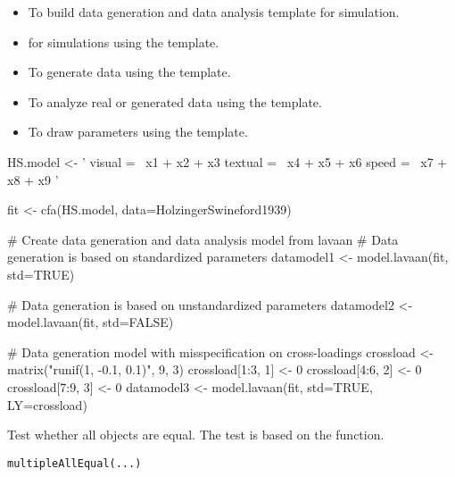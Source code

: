 \documentclass[a4paper]{book}
\begin{document}
\begin{SeeAlso}\relax
\begin{itemize}

\item {} To build data generation and data analysis template for simulation.
\item {} for simulations using the  template.
\item {} To generate data using the  template.
\item {} To analyze real or generated data using the  template.
\item {} To draw parameters using the  template.

\end{itemize}

\end{SeeAlso}
%
\begin{Examples}
\begin{ExampleCode}
HS.model <- ' visual  =~ x1 + x2 + x3
             textual =~ x4 + x5 + x6
             speed   =~ x7 + x8 + x9 '

fit <- cfa(HS.model, data=HolzingerSwineford1939)

# Create data generation and data analysis model from lavaan
# Data generation is based on standardized parameters
datamodel1 <- model.lavaan(fit, std=TRUE)

# Data generation is based on unstandardized parameters
datamodel2 <- model.lavaan(fit, std=FALSE)

# Data generation model with misspecification on cross-loadings
crossload <- matrix("runif(1, -0.1, 0.1)", 9, 3)
crossload[1:3, 1] <- 0
crossload[4:6, 2] <- 0
crossload[7:9, 3] <- 0
datamodel3 <- model.lavaan(fit, std=TRUE, LY=crossload)
\end{ExampleCode}
\end{Examples}
%
\begin{Description}\relax
Test whether all objects are equal. The test is based on the  function.
\end{Description}
%
\begin{Usage}
\begin{verbatim}
multipleAllEqual(...)
\end{verbatim}
\end{Usage}
\end{document}
